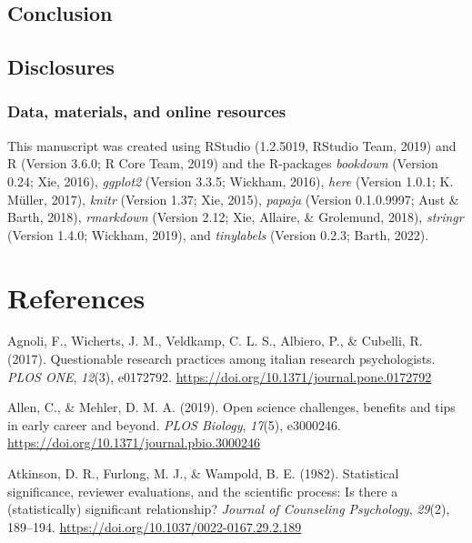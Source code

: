 \documentclass[british,,man,mask,floatsintext]{apa6}
\begin{document}
\hypertarget{conclusion}{%
\subsection{Conclusion}\label{conclusion}}

\hypertarget{disclosures}{%
\subsection{Disclosures}\label{disclosures}}

\hypertarget{data-materials-and-online-resources}{%
\subsubsection{Data, materials, and online resources}\label{data-materials-and-online-resources}}

This manuscript was created using RStudio (1.2.5019, RStudio Team, 2019) and R (Version 3.6.0; R Core Team, 2019) and the R-packages \emph{bookdown} (Version 0.24; Xie, 2016), \emph{ggplot2} (Version 3.3.5; Wickham, 2016), \emph{here} (Version 1.0.1; K. Müller, 2017), \emph{knitr} (Version 1.37; Xie, 2015), \emph{papaja} (Version 0.1.0.9997; Aust \& Barth, 2018), \emph{rmarkdown} (Version 2.12; Xie, Allaire, \& Grolemund, 2018), \emph{stringr} (Version 1.4.0; Wickham, 2019), and \emph{tinylabels} (Version 0.2.3; Barth, 2022).

\hypertarget{references}{%
\section{References}\label{references}}

\setlength{\parindent}{-0.2in}
\setlength{\leftskip}{0.2in}

\hypertarget{refs}{}
\leavevmode\hypertarget{ref-Agnoli2017}{}%
Agnoli, F., Wicherts, J. M., Veldkamp, C. L. S., Albiero, P., \& Cubelli, R. (2017). Questionable research practices among italian research psychologists. \emph{PLOS ONE}, \emph{12}(3), e0172792. \url{https://doi.org/10.1371/journal.pone.0172792}

\leavevmode\hypertarget{ref-Allen2019}{}%
Allen, C., \& Mehler, D. M. A. (2019). Open science challenges, benefits and tips in early career and beyond. \emph{PLOS Biology}, \emph{17}(5), e3000246. \url{https://doi.org/10.1371/journal.pbio.3000246}

\leavevmode\hypertarget{ref-Atkinson1982}{}%
Atkinson, D. R., Furlong, M. J., \& Wampold, B. E. (1982). Statistical significance, reviewer evaluations, and the scientific process: Is there a (statistically) significant relationship? \emph{Journal of Counseling Psychology}, \emph{29}(2), 189--194. \url{https://doi.org/10.1037/0022-0167.29.2.189}
\end{document}
